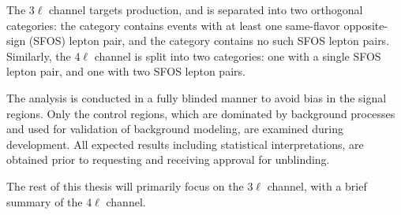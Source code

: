 The 3$\ell$ channel targets \wh{} production, and is separated into two orthogonal categories: the \zdom{} category contains events with at least one same-flavor opposite-sign (SFOS) lepton pair, and the \zdep{} category contains no such SFOS lepton pairs. Similarly, the 4$\ell$ channel is split into two categories: one with a single SFOS lepton pair, and one with two SFOS lepton pairs.

The analysis is conducted in a fully blinded manner to avoid bias in the signal regions. Only the control regions, which are dominated by background processes and used for validation of background modeling, are examined during development. All expected results including statistical interpretations, are obtained prior to requesting and receiving approval for unblinding.

The rest of this thesis will primarily focus on the 3$\ell$ channel, with a brief summary of the 4$\ell$ channel.
